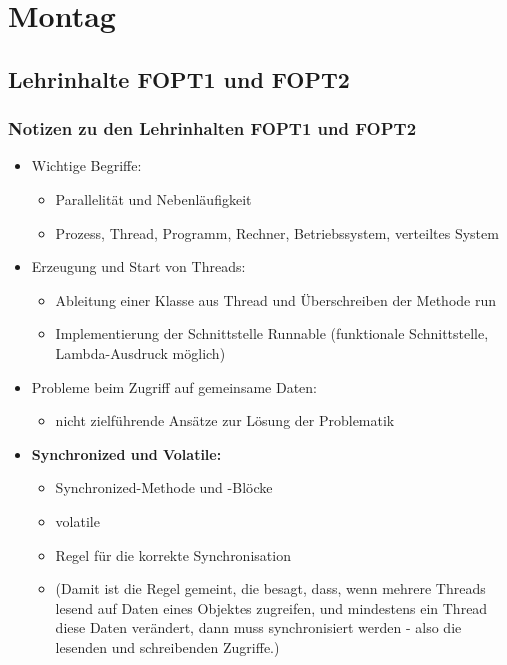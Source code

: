 \section{Montag}

\subsection{Lehrinhalte FOPT1 und FOPT2}

\subsubsection{Notizen zu den Lehrinhalten FOPT1 und FOPT2}
    \begin{itemize}
        \item Wichtige Begriffe:
        \begin{itemize}
                  \item Parallelität und Nebenläufigkeit
                  \item Prozess, Thread, Programm, Rechner, Betriebssystem, verteiltes System
        \end{itemize}
        \item Erzeugung und Start von Threads:
        \begin{itemize}
            \item Ableitung einer Klasse aus Thread und Überschreiben der Methode run
            \item Implementierung der Schnittstelle Runnable (funktionale Schnittstelle, Lambda-Ausdruck möglich)
        \end{itemize}
        \item Probleme beim Zugriff auf gemeinsame Daten:
        \begin{itemize}
            \item nicht zielführende Ansätze zur Lösung der Problematik
        \end{itemize}

        \item \textbf{Synchronized und Volatile:}
        \begin{itemize}
            \item Synchronized-Methode und -Blöcke
            \item volatile
            \item Regel für die korrekte Synchronisation
            \item[] (Damit ist die Regel gemeint, die besagt, dass, wenn mehrere Threads lesend auf Daten eines Objektes zugreifen, und mindestens ein Thread diese Daten verändert, dann muss synchronisiert werden - also die lesenden und schreibenden Zugriffe.)
        \end{itemize}


\end{itemize}
